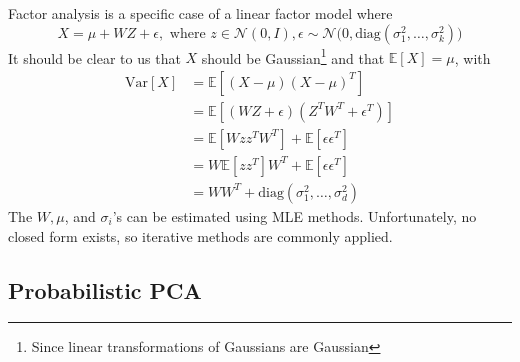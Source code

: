   \begin{definition} 
    Factor analysis is a specific case of a linear factor model where 
    \begin{equation}
      X = \mu + WZ + \epsilon, \text{ where } z \in \mathcal{N}(0, I), \epsilon \sim \mathcal{N} \big(0, \mathrm{diag}(\sigma_1^2, \ldots, \sigma_k^2) \big)
    \end{equation}
    It should be clear to us that $X$ should be Gaussian\footnote{Since linear transformations of Gaussians are Gaussian} and that $\mathbb{E}[X] = \mu$, with 
    \begin{align} 
        \mathrm{Var}[X] & = \mathbb{E}[ (X - \mu)(X - \mu)^T ] \\
                        & = \mathbb{E}[ (W Z + \epsilon) (Z^T W^T + \epsilon^T)] \\
                        & = \mathbb{E}[W z z^T W^T] + \mathbb{E}[ \epsilon \epsilon^T] \\
                        & = W \mathbb{E}[ z z^T] W^T + \mathbb{E}[ \epsilon \epsilon^T] \\
                        & = W W^T + \mathrm{diag}(\sigma_1^2, \ldots, \sigma_d^2) 
    \end{align} 
    The $W, \mu$, and $\sigma_i$'s can be estimated using MLE methods. Unfortunately, no closed form  exists, so iterative methods are commonly applied. 
  \end{definition} 

\subsection{Probabilistic PCA}

